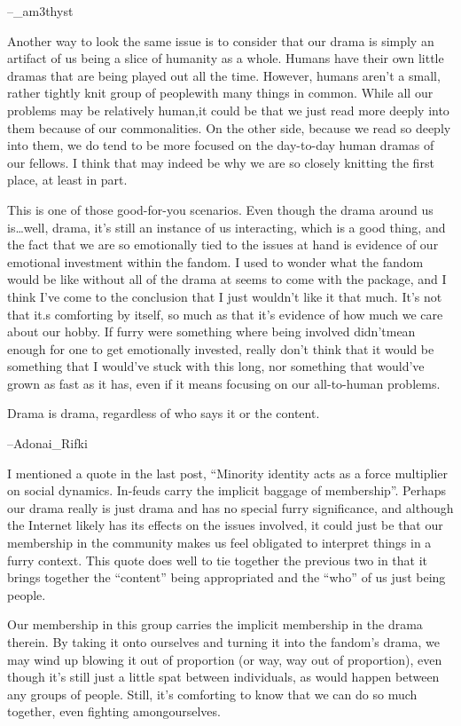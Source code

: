 --\_am3thyst

Another way to look the same issue is to consider that our drama is simply an artifact of us being a slice of humanity as a whole. Humans have their own little dramas that are being played out all the time. However, humans aren't a small, rather tightly knit group of peoplewith many things in common. While all our problems may be relatively human,it could be that we just read more deeply into them because of our commonalities. On the other side, because we read so deeply into them, we do tend to be more focused on the day-to-day human dramas of our fellows. I think that may indeed be why we are so closely knitting the first place, at least in part.

This is one of those good-for-you scenarios. Even though the drama around us is\ldots{}well, drama, it's still an instance of us interacting, which is a good thing, and the fact that we are so emotionally tied to the issues at hand is evidence of our emotional investment within the fandom. I used to wonder what the fandom would be like without all of the drama at seems to come with the package, and I think I've come to the conclusion that I just wouldn't like it that much. It's not that it.s comforting by itself, so much as that it's evidence of how much we care about our hobby. If furry were something where being involved didn'tmean enough for one to get emotionally invested, really don't think that it would be something that I would've stuck with this long, nor something that would've grown as fast as it has, even if it means focusing on our all-to-human problems.

Drama is drama, regardless of who says it or the content.

--Adonai\_Rifki

I mentioned a quote in the last post, ``Minority identity acts as a force multiplier on social dynamics. In-feuds carry the implicit baggage of membership''. Perhaps our drama really is just drama and has no special furry significance, and although the Internet likely has its effects on the issues involved, it could just be that our membership in the community makes us feel obligated to interpret things in a furry context. This quote does well to tie together the previous two in that it brings together the ``content'' being appropriated and the ``who'' of us just being people.

Our membership in this group carries the implicit membership in the drama therein. By taking it onto ourselves and turning it into the fandom's drama, we may wind up blowing it out of proportion (or way, way out of proportion), even though it's still just a little spat between individuals, as would happen between any groups of people. Still, it's comforting to know that we can do so much together, even fighting amongourselves.

